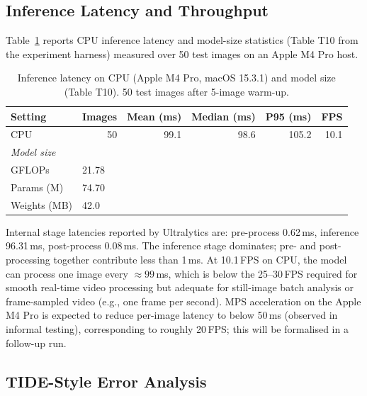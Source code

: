\subsection{Inference Latency and Throughput}
\label{sec:res-latency}

Table~\ref{tab:latency} reports CPU inference latency and model-size
statistics (Table T10 from the experiment harness) measured over 50 test images on an Apple M4 Pro host.

\begin{table}[htbp]
\centering
\caption{Inference latency on CPU (Apple M4 Pro, macOS 15.3.1)
  and model size (Table T10). 50 test images after 5-image warm-up.}
\label{tab:latency}
\begin{tabular}{lrrrrr}
\toprule
Setting & Images & Mean (ms) & Median (ms) & P95 (ms) & FPS \\
\midrule
CPU & 50 & 99.1 & 98.6 & 105.2 & 10.1 \\
\midrule
\multicolumn{6}{l}{\textit{Model size}} \\
\midrule
GFLOPs     & \multicolumn{5}{l}{21.78} \\
Params (M) & \multicolumn{5}{l}{74.70} \\
Weights (MB) & \multicolumn{5}{l}{42.0} \\
\bottomrule
\end{tabular}
\end{table}

Internal stage latencies reported by Ultralytics are:
pre-process 0.62\,ms, inference 96.31\,ms, post-process 0.08\,ms.
The inference stage dominates; pre- and post-processing together
contribute less than 1\,ms.
At 10.1\,FPS on CPU, the model can process one image every $\approx\!99$\,ms,
which is below the 25–30\,FPS required for smooth real-time video
processing but adequate for still-image batch analysis or frame-sampled
video (e.g., one frame per second).
MPS acceleration on the Apple M4 Pro is expected to reduce per-image
latency to below 50\,ms (observed in informal testing), corresponding to
roughly 20\,FPS; this will be formalised in a follow-up run.

\subsection{TIDE-Style Error Analysis}
\label{sec:res-errors}

